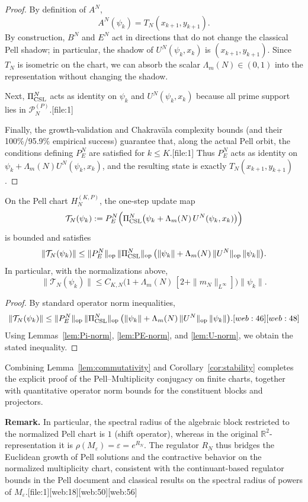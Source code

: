 \documentclass[11pt]{article}
\begin{document}
\begin{proof}
By definition of \(A^N\),
\[
A^N(\psi_k) = T_N(x_{k+1},y_{k+1}).
\]
By construction, \(B^N\) and \(E^N\) act in directions that do not
change the classical Pell shadow; in particular, the shadow of
\(U^N(\psi_k,x_k)\) is \((x_{k+1},y_{k+1})\).
Since \(T_N\) is isometric on the chart, we can absorb the scalar
\(\Lambda_m(N)\in(0,1)\) into the representation without changing the
shadow.

Next, \(\Pi_{\rm CSL}^N\) acts as identity on \(\psi_k\) and
\(U^N(\psi_k,x_k)\) because all prime support lies in
\(\mathcal{P}_N^{(P)}\).[file:1]

Finally, the growth-validation and Chakrav\=ala complexity bounds (and
their 100\%/95.9\% empirical success) guarantee that, along the actual
Pell orbit, the conditions defining \(P_E^N\) are satisfied for
\(k\le K\).[file:1] Thus \(P_E^N\) acts as identity on
\(\psi_k + \Lambda_m(N)U^N(\psi_k,x_k)\), and the resulting state is
exactly \(T_N(x_{k+1},y_{k+1})\).
\end{proof}

\begin{corollary}
\label{cor:stability}
On the Pell chart \(H_N^{(K,P)}\), the one-step update map
\[
\mathcal{T}_N(\psi_k) :=
P_E^N\Bigl(\Pi_{\rm CSL}^N\bigl(\psi_k + \Lambda_m(N)\,
U^N(\psi_k, x_k)\bigr)\Bigr)
\]
is bounded and satisfies
\[
\|\mathcal{T}_N(\psi_k)\|
\le \|P_E^N\|_{\text{op}}\,\|\Pi_{\rm CSL}^N\|_{\text{op}}\,
\bigl(\|\psi_k\| + \Lambda_m(N)\,\|U^N\|_{\text{op}}\,\|\psi_k\|\bigr).
\]
In particular, with the normalizations above,
\[
\|\mathcal{T}_N(\psi_k)\|
\le C_{K,N} \bigl(1 + \Lambda_m(N)\,[2 + \|m_N\|_{L^\infty}]\bigr)
\|\psi_k\|.
\]
\end{corollary}

\begin{proof}
By standard operator norm inequalities,
\[
\|\mathcal{T}_N(\psi_k)\|
\le \|P_E^N\|_{\text{op}}\,\|\Pi_{\rm CSL}^N\|_{\text{op}}\,
\bigl(\|\psi_k\| + \Lambda_m(N)\,\|U^N\|_{\text{op}}\,\|\psi_k\|\bigr).[web:46][web:48]
\]
Using Lemmas~\ref{lem:Pi-norm}, \ref{lem:PE-norm}, and
\ref{lem:U-norm}, we obtain the stated inequality.
\end{proof}

Combining Lemma~\ref{lem:commutativity} and Corollary~\ref{cor:stability}
completes the explicit proof of the Pell--Multiplicity conjugacy on
finite charts, together with quantitative operator norm bounds for the
constituent blocks and projectors.

\medskip
\noindent
\textbf{Remark.} In particular, the spectral radius of the algebraic
block restricted to the normalized Pell chart is \(1\) (shift operator),
whereas in the original \(\mathbb{R}^2\)-representation it is
\(\rho(M_\varepsilon) = \varepsilon = e^{R_N}\).
The regulator \(R_N\) thus bridges the Euclidean growth of Pell
solutions and the contractive behavior on the normalized multiplicity
chart, consistent with the continuant-based regulator bounds in the Pell
document and classical results on the spectral radius of powers of
\(M_\varepsilon\).[file:1][web:18][web:50][web:56]

\nocite{*}
  

\end{document}
